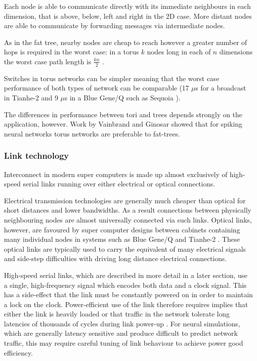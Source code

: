 				Each node is able to communicate directly with its immediate neighbours
				in each dimension, that is above, below, left and right in the 2D case.
				More distant nodes are able to communicate by forwarding messages via
				intermediate nodes.
				
				As in the fat tree, nearby nodes are cheap to reach however a greater
				number of hops is required in the worst case: in a torus $k$ nodes long
				in each of $n$ dimensions the worst case path length is $\frac{kn}{2}$
				\cite{dally04}.
				
				Switches in torus networks can be simpler meaning that the worst case
				performance of both types of network can be comparable (17 $\mu$s for a
				broadcast in Tianhe-2 and 9 $\mu$s in a Blue Gene/Q such as Sequoia
				\cite{dongarra13,morozov12}).
				
				The differences in performance between tori and trees depends strongly
				on the application, however. Work by Vainbrand and Ginosar
				\cite{vainbrand11} showed that for spiking neural networks torus
				networks are preferable to fat-trees.
			
			\subsubsection{Link technology}
				
				
				Interconnect in modern super computers is made up almost exclusively of
				high-speed serial links running over either electrical or optical
				connections.
				
				Electrical transmission technologies are generally much cheaper than
				optical for short distances and lower bandwidths. As a result
				connections between physically neighbouring nodes are almost universally
				connected via such links.  Optical links, however, are favoured by super
				computer designs between cabinets containing many individual nodes in
				systems such as Blue Gene/Q and Tianhe-2 \cite{dongarra13,prickett10}.
				These optical links are typically used to carry the equivalent of many
				electrical signals and side-step difficulties with driving long distance
				electrical connections.
				
				High-speed serial links, which are described in more detail in a later
				section, use a single, high-frequency signal which encodes both data and
				a clock signal. This has a side-effect that the link must be constantly
				powered on in order to maintain a lock on the clock.  Power-efficient
				use of the link therefore requires implies that either the link is
				heavily loaded or that traffic in the network tolerate long latencies of
				thousands of cycles during link power-up \cite{soteriou03}. For neural
				simulations, which are generally latency sensitive and produce difficult
				to predict network traffic, this may require careful tuning of link
				behaviour to achieve power good efficiency.
				
